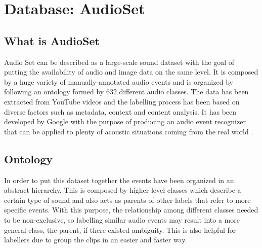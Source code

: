 



\section{Database: AudioSet}
\label{section:audioset}

\subsection{What is AudioSet} 

	Audio Set can be described as a large-scale sound dataset with the goal of putting the availability of audio and image data on the same level. It is composed by a huge variety of manually-annotated audio events and is organized by following an ontology formed by 632 different audio classes. The data has been extracted from YouTube videos and the labelling process has been based on diverse factors such as metadata, context and content analysis. It has been developed by Google with the purpose of producing an audio event recognizer that can be applied to plenty of acoustic situations coming from the real world \cite{Gemmeke2017}.
	
\subsection{Ontology}
\label{subsecition:ontology}

	In order to put this dataset together the events have been organized in an abstract hierarchy. This is composed by higher-level classes which  describe a certain type of sound and also acts as parents of other labels that refer to more specific events. With this purpose, the relationship among different classes needed to be non-exclusive, so labelling similar audio events may result into a more general class, the parent, if there existed ambiguity. This is also helpful for labellers due to group the clips in an easier and faster way.
	

